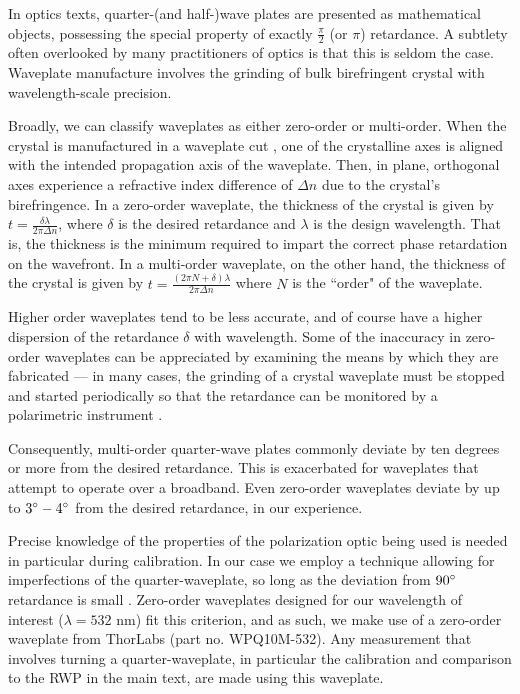 \documentclass[footinbib,aps,prl,superscriptaddress]{revtex4-1}
\begin{document}
In optics texts, quarter-(and half-)wave plates are presented as mathematical objects, possessing the special property of exactly $\frac{\pi}{2}$ (or $\pi$) retardance. A subtlety often overlooked by many practitioners of optics is that this is seldom the case. Waveplate manufacture involves the grinding of bulk birefringent crystal with wavelength-scale precision.

Broadly, we can classify waveplates as either zero-order or multi-order. When the crystal is manufactured in a waveplate cut \cite{Damask2005}, one of the crystalline axes is aligned with the intended propagation axis of the waveplate. Then, in plane, orthogonal axes experience a refractive index difference of $\Delta n$ due to the crystal's birefringence. In a zero-order waveplate, the thickness of the crystal is given by $t = \frac{\delta \lambda}{2\pi\Delta n}$, where $\delta$ is the desired retardance and $\lambda$ is the design wavelength. That is, the thickness is the minimum required to impart the correct phase retardation on the wavefront. In a multi-order waveplate, on the other hand, the thickness of the crystal is given by $t = \frac{ (2\pi N+\delta) \lambda}{2\pi\Delta n}$ where $N$ is the ``order" of the waveplate.

Higher order waveplates tend to be less accurate, and of course have a higher dispersion of the retardance $\delta$ with wavelength. Some of the inaccuracy in zero-order waveplates can be appreciated by examining the means by which they are fabricated --- in many cases, the grinding of a crystal waveplate must be stopped and started periodically so that the retardance can be monitored by a polarimetric instrument \cite{Damask2005}.

Consequently, multi-order quarter-wave plates commonly deviate by ten degrees or more from the desired retardance. This is exacerbated for waveplates that attempt to operate over a broadband. Even zero-order waveplates deviate by up to $3\degree - 4\degree$ from the desired retardance, in our experience.

Precise knowledge of the properties of the polarization optic being used is needed in particular during calibration. In our case we employ a technique allowing for imperfections of the quarter-waveplate, so long as the deviation from $90\degree$ retardance is small \citep{Azzam1989}. Zero-order waveplates designed for our wavelength of interest ($\lambda=532$ nm) fit this criterion, and as such, we make use of a zero-order waveplate from ThorLabs (part no. WPQ10M-532). Any measurement that involves turning a quarter-waveplate, in particular the calibration and comparison to the RWP in the main text, are made using this waveplate.
\end{document}
